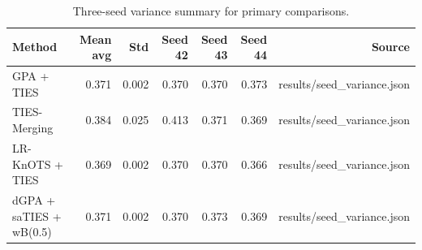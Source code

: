 \begin{table}[htbp]
\centering
\caption{Three-seed variance summary for primary comparisons.}
\label{tab:seed-variance}
\begin{tabular}{lrrrrrr}
\toprule
Method & Mean avg & Std & Seed 42 & Seed 43 & Seed 44 & Source \\
\midrule
GPA + TIES & 0.371 & 0.002 & 0.370 & 0.370 & 0.373 & results/seed\_variance.json \\
TIES-Merging & 0.384 & 0.025 & 0.413 & 0.371 & 0.369 & results/seed\_variance.json \\
LR-KnOTS + TIES & 0.369 & 0.002 & 0.370 & 0.370 & 0.366 & results/seed\_variance.json \\
dGPA + saTIES + wB(0.5) & 0.371 & 0.002 & 0.370 & 0.373 & 0.369 & results/seed\_variance.json \\
\bottomrule
\end{tabular}
\end{table}
